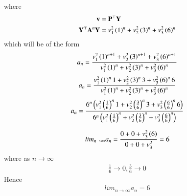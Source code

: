 \documentclass[journal]{IEEEtran}
\begin{document}
where
\begin{align}
    \mathbf{v}&=\mathbf{P}^\top\mathbf{Y} \\
\mathbf{Y}^\top\mathbf{A}^n\mathbf{Y}&=v_1^2\left(1\right)^n+v_2^2\left(3\right)^n+v_3^2\left(6\right)^n
\end{align}
which will be of the form
\begin{align}
a_n=\frac{v_1^2\left(1\right)^{n+1}+v_2^2\left(3\right)^{n+1}+v_3^2\left(6\right)^{n+1}}{v_1^2\left(1\right)^n+v_2^2\left(3\right)^n+v_3^2\left(6\right)^n}
\end{align}
\begin{align}
a_n=\frac{v_1^2\left(1\right)^{n}1+v_2^2\left(3\right)^{n}3+v_3^2\left(6\right)^{n}6}{v_1^2\left(1\right)^n+v_2^2\left(3\right)^n+v_3^2\left(6\right)^n} 
\end{align}
\begin{align}
   a_n= \frac{6^n\left(v_1^2\left(\frac{1}{6}\right)^{n}1+v_2^2\left(\frac{3}{6}\right)^{n}3+v_3^2\left(\frac{6}{6}\right)^{n}6\right)}{6^n\left(v_1^2\left(\frac{1}{6}\right)^n+v_2^2\left(\frac{3}{6}\right)^n+v_3^2\left(\frac{6}{6}\right)^n\right)} 
\end{align}

\begin{align}
    lim_{n\rightarrow\infty}a_n = \frac{0+0+v_3^2\left(6\right)}{0+0+v_3^2}=6
\end{align}
where as $n\rightarrow\infty$
\begin{align}
    \frac{1}{6} \rightarrow 0 ,\frac{3}{6} \rightarrow 0
\end{align}
Hence
\begin{align}
    lim_{n\rightarrow\infty}a_n=6
\end{align}
 
\end{document}
